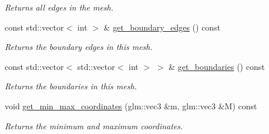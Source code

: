 \begin{DoxyCompactItemize}
\begin{DoxyCompactList}\small\item\em Returns all edges in the mesh. \end{DoxyCompactList}\item 
const std\+::vector$<$ int $>$ \& \hyperlink{classgeoproc_1_1TriangleMesh_a0cf960fcf069954b51ce567304359d4e}{get\+\_\+boundary\+\_\+edges} () const
\begin{DoxyCompactList}\small\item\em Returns the boundary edges in this mesh. \end{DoxyCompactList}\item 
const std\+::vector$<$ std\+::vector$<$ int $>$ $>$ \& \hyperlink{classgeoproc_1_1TriangleMesh_a07a91ab963592c2560eec6409194ba66}{get\+\_\+boundaries} () const
\begin{DoxyCompactList}\small\item\em Returns the boundaries in this mesh. \end{DoxyCompactList}\item 
void \hyperlink{classgeoproc_1_1TriangleMesh_a00f918f8d96560f640efd244fd273cec}{get\+\_\+min\+\_\+max\+\_\+coordinates} (glm\+::vec3 \&m, glm\+::vec3 \&M) const
\begin{DoxyCompactList}\small\item\em Returns the minimum and maximum coordinates. \end{DoxyCompactList}\end{DoxyCompactItemize}
